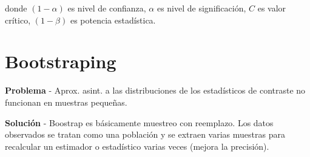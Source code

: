 \documentclass[10pt, a4paper, landscape]{article}
\begin{document}
\begin{multicols}{3}
		donde $(1 - \alpha)$ es nivel de confianza, $\alpha$ es nivel de significación, $C$ es valor crítico, $(1 - \beta)$ es potencia estadística.
		
		\section*{Bootstraping}
		
		\textbf{Problema} - Aprox. asint. a las distribuciones de los estadísticos de contraste no funcionan en muestras pequeñas.
		
		\textbf{Solución} - Boostrap es básicamente muestreo con reemplazo. Los datos observados se tratan como una población y se extraen varias muestras para recalcular un estimador o estadístico varias veces (mejora la precisión).
	\end{multicols}
	
\end{document}
